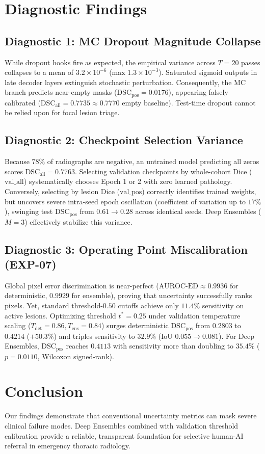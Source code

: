 \documentclass[runningheads]{llncs}
\begin{document}
\section{Diagnostic Findings}

\subsection{Diagnostic 1: MC Dropout Magnitude Collapse}
While dropout hooks fire as expected, the empirical variance across $T=20$ passes collapses to a mean of $3.2 \times 10^{-6}$ (max $1.3 \times 10^{-3}$). Saturated sigmoid outputs in late decoder layers extinguish stochastic perturbation. Consequently, the MC branch predicts near-empty masks ($\text{DSC}_{\text{pos}} = 0.0176$), appearing falsely calibrated ($\text{DSC}_{\text{all}} = 0.7735 \approx 0.7770$ empty baseline). Test-time dropout cannot be relied upon for focal lesion triage.

\subsection{Diagnostic 2: Checkpoint Selection Variance}
Because $78\%$ of radiographs are negative, an untrained model predicting all zeros scores $\text{DSC}_{\text{all}} = 0.7763$. Selecting validation checkpoints by whole-cohort Dice ($\text{val\_all}$) systematically chooses Epoch 1 or 2 with zero learned pathology. Conversely, selecting by lesion Dice ($\text{val\_pos}$) correctly identifies trained weights, but uncovers severe intra-seed epoch oscillation (coefficient of variation up to $17\%$), swinging test $\text{DSC}_{\text{pos}}$ from $0.61 \to 0.28$ across identical seeds. Deep Ensembles ($M=3$) effectively stabilize this variance.

\subsection{Diagnostic 3: Operating Point Miscalibration (EXP-07)}
Global pixel error discrimination is near-perfect ($\text{AUROC-ED} \approx 0.9936$ for deterministic, $0.9929$ for ensemble), proving that uncertainty successfully ranks pixels. Yet, standard threshold-$0.50$ cutoffs achieve only $11.4\%$ sensitivity on active lesions.
Optimizing threshold $t^* = 0.25$ under validation temperature scaling ($T_{\text{det}} = 0.86, T_{\text{ens}} = 0.84$) surges deterministic $\text{DSC}_{\text{pos}}$ from $0.2803$ to $\mathbf{0.4214}$ ($+50.3\%$) and triples sensitivity to $32.9\%$ (IoU $0.055 \to 0.081$). For Deep Ensembles, $\text{DSC}_{\text{pos}}$ reaches $0.4113$ with sensitivity more than doubling to $35.4\%$ ($p = 0.0110$, Wilcoxon signed-rank).

\section{Conclusion}
Our findings demonstrate that conventional uncertainty metrics can mask severe clinical failure modes. Deep Ensembles combined with validation threshold calibration provide a reliable, transparent foundation for selective human-AI referral in emergency thoracic radiology.



\end{document}
